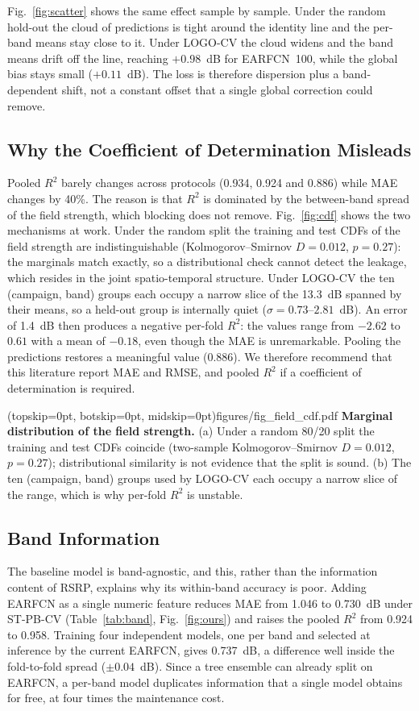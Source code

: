 \documentclass{ieeeaccess}
\begin{document}
Fig.~\ref{fig:scatter} shows the same effect sample by sample. Under the random
hold-out the cloud of predictions is tight around the identity line and the
per-band means stay close to it. Under LOGO-CV the cloud widens and the band
means drift off the line, reaching $+0.98$~dB for EARFCN~100, while the global
bias stays small ($+0.11$~dB). The loss is therefore dispersion plus a
band-dependent shift, not a constant offset that a single global correction could
remove.

\subsection{Why the Coefficient of Determination Misleads}
\label{sec:r2}
Pooled $R^2$ barely changes across protocols (0.934, 0.924 and 0.886) while MAE
changes by 40\%. The reason is that $R^2$ is dominated by the between-band spread
of the field strength, which blocking does not remove. Fig.~\ref{fig:cdf} shows
the two mechanisms at work. Under the random split the training and test CDFs of
the field strength are indistinguishable (Kolmogorov--Smirnov $D=0.012$,
$p=0.27$): the marginals match exactly, so a distributional check cannot detect
the leakage, which resides in the joint spatio-temporal structure. Under LOGO-CV
the ten (campaign, band) groups each occupy a narrow slice of the 13.3~dB spanned
by their means, so a held-out group is internally quiet
($\sigma=0.73$--$2.81$~dB). An error of 1.4~dB then produces a negative per-fold
$R^2$: the values range from $-2.62$ to $0.61$ with a mean of $-0.18$, even
though the MAE is unremarkable. Pooling the predictions restores a meaningful
value (0.886). We therefore recommend that this literature report MAE and RMSE,
and pooled $R^2$ if a coefficient of determination is required.

\Figure[t!](topskip=0pt, botskip=0pt, midskip=0pt){figures/fig_field_cdf.pdf}
{\textbf{Marginal distribution of the field strength.} (a) Under a random 80/20
split the training and test CDFs coincide (two-sample Kolmogorov--Smirnov
$D=0.012$, $p=0.27$); distributional similarity is not evidence that the split is
sound. (b) The ten (campaign, band) groups used by LOGO-CV each occupy a narrow
slice of the range, which is why per-fold $R^2$ is unstable.\label{fig:cdf}}

\subsection{Band Information}
The baseline model is band-agnostic, and this, rather than the information content
of RSRP, explains why its within-band accuracy is poor. Adding EARFCN as a single
numeric feature reduces MAE from 1.046 to 0.730~dB under ST-PB-CV
(Table~\ref{tab:band}, Fig.~\ref{fig:ours}) and raises the pooled $R^2$ from 0.924
to 0.958. Training four independent models, one per band and selected at inference
by the current EARFCN, gives 0.737~dB, a difference well inside the fold-to-fold
spread ($\pm0.04$~dB). Since a tree ensemble can already split on EARFCN, a
per-band model duplicates information that a single model obtains for free, at
four times the maintenance cost.
\end{document}

